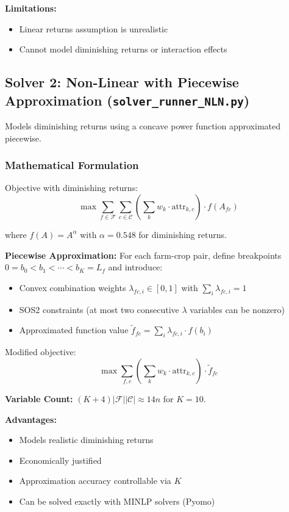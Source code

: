 \documentclass[11pt,a4paper]{article}
\begin{document}
\textbf{Limitations:}
\begin{itemize}
    \item Linear returns assumption is unrealistic
    \item Cannot model diminishing returns or interaction effects
\end{itemize}

\subsection{Solver 2: Non-Linear with Piecewise Approximation (\texttt{solver\_runner\_NLN.py})}

Models diminishing returns using a concave power function approximated piecewise.

\subsubsection{Mathematical Formulation}

Objective with diminishing returns:
\begin{equation}
\max \sum_{f \in \mathcal{F}} \sum_{c \in \mathcal{C}} \left(\sum_{k} w_k \cdot \text{attr}_{k,c}\right) \cdot f(A_{fc})
\end{equation}

where $f(A) = A^\alpha$ with $\alpha = 0.548$ for diminishing returns.

\textbf{Piecewise Approximation:}
For each farm-crop pair, define breakpoints $0 = b_0 < b_1 < \cdots < b_K = L_f$ and introduce:
\begin{itemize}
    \item Convex combination weights $\lambda_{fc,i} \in [0,1]$ with $\sum_i \lambda_{fc,i} = 1$
    \item SOS2 constraints (at most two consecutive $\lambda$ variables can be nonzero)
    \item Approximated function value $\tilde{f}_{fc} = \sum_i \lambda_{fc,i} \cdot f(b_i)$
\end{itemize}

Modified objective:
\begin{equation}
\max \sum_{f,c} \left(\sum_k w_k \cdot \text{attr}_{k,c}\right) \cdot \tilde{f}_{fc}
\end{equation}

\textbf{Variable Count:} $(K+4)|\mathcal{F}||\mathcal{C}| \approx 14n$ for $K=10$.

\textbf{Advantages:}
\begin{itemize}
    \item Models realistic diminishing returns
    \item Economically justified
    \item Approximation accuracy controllable via $K$
    \item Can be solved exactly with MINLP solvers (Pyomo)
\end{itemize}
\end{document}
